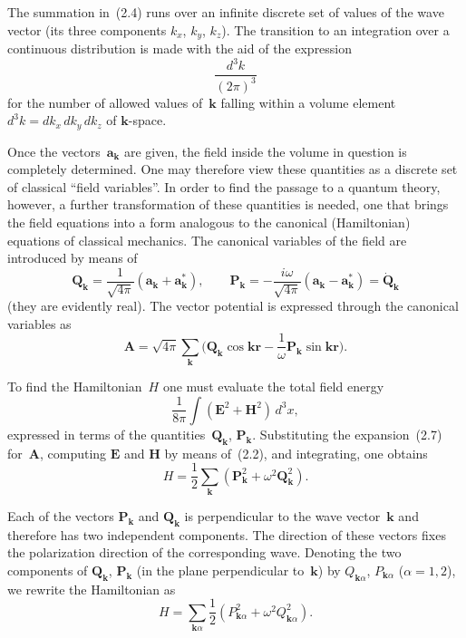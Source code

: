 The summation in~(2.4) runs over an infinite discrete set of values of the wave vector (its three components $k_x$, $k_y$, $k_z$). The transition to an integration over a continuous distribution is made with the aid of the expression
\[
\frac{d^3k}{(2\pi)^3}
\]
for the number of allowed values of~$\mathbf{k}$ falling within a volume element $d^3k = dk_x\,dk_y\,dk_z$ of $\mathbf{k}$-space.

Once the vectors~$\mathbf{a}_{\mathbf{k}}$ are given, the field inside the volume in question is completely determined. One may therefore view these quantities as a discrete set of classical ``field variables''. In order to find the passage to a quantum theory, however, a further transformation of these quantities is needed, one that brings the field equations into a form analogous to the canonical (Hamiltonian) equations of classical mechanics. The canonical variables of the field are introduced by means of
\begin{equation}
\mathbf{Q}_{\mathbf{k}} = \frac{1}{\sqrt{4\pi}}(\mathbf{a}_{\mathbf{k}} + \mathbf{a}_{\mathbf{k}}^*), \qquad
\mathbf{P}_{\mathbf{k}} = -\frac{i\omega}{\sqrt{4\pi}}(\mathbf{a}_{\mathbf{k}} - \mathbf{a}_{\mathbf{k}}^*) = \dot{\mathbf{Q}}_{\mathbf{k}}
\tag{2.6}
\end{equation}
(they are evidently real). The vector potential is expressed through the canonical variables as
\begin{equation}
\mathbf{A} = \sqrt{4\pi} \sum_{\mathbf{k}} \biggl(\mathbf{Q}_{\mathbf{k}} \cos\mathbf{kr} - \frac{1}{\omega}\mathbf{P}_{\mathbf{k}} \sin\mathbf{kr}\biggr).
\tag{2.7}
\end{equation}

To find the Hamiltonian~$H$ one must evaluate the total field energy
\[
\frac{1}{8\pi}\int (\mathbf{E}^2 + \mathbf{H}^2)\,d^3x,
\]
expressed in terms of the quantities~$\mathbf{Q}_{\mathbf{k}}$, $\mathbf{P}_{\mathbf{k}}$. Substituting the expansion~(2.7) for~$\mathbf{A}$, computing $\mathbf{E}$ and $\mathbf{H}$ by means of~(2.2), and integrating, one obtains
\[
H = \frac{1}{2}\sum_{\mathbf{k}} (\mathbf{P}_{\mathbf{k}}^2 + \omega^2 \mathbf{Q}_{\mathbf{k}}^2).
\]

Each of the vectors $\mathbf{P}_{\mathbf{k}}$ and $\mathbf{Q}_{\mathbf{k}}$ is perpendicular to the wave vector~$\mathbf{k}$ and therefore has two independent components. The direction of these vectors fixes the polarization direction of the corresponding wave. Denoting the two components of $\mathbf{Q}_{\mathbf{k}}$, $\mathbf{P}_{\mathbf{k}}$ (in the plane perpendicular to~$\mathbf{k}$) by $Q_{\mathbf{k}\alpha}$, $P_{\mathbf{k}\alpha}$ ($\alpha = 1, 2$), we rewrite the Hamiltonian as
\begin{equation}
H = \sum_{\mathbf{k}\alpha} \frac{1}{2} (P_{\mathbf{k}\alpha}^2 + \omega^2 Q_{\mathbf{k}\alpha}^2).
\tag{2.8}
\end{equation}

